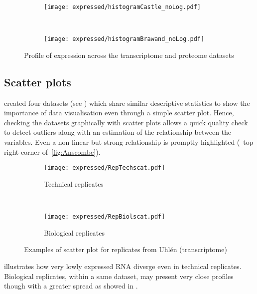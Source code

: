 \begin{sidewaysfigure}
    \centering
    \begin{subfigure}[b]{0.45\textwidth}
        \centering \texttt{[image: expressed/histogramCastle\_noLog.pdf]}
        \caption{}\label{fig:histCastle_nolog}
    \end{subfigure}%
~%
    \begin{subfigure}[b]{0.45\textwidth}
        \centering \texttt{[image: expressed/histogramBrawand\_noLog.pdf]}
        \caption{}\label{fig:histBrawand_nolog}
    \end{subfigure}
    \caption{Profile of expression across the transcriptome
     and proteome datasets}\label{fig:distribPlot}
\end{sidewaysfigure}

\subsection{Scatter plots}

\cite{anscombe} created four datasets (see )
which share similar descriptive statistics to show the importance
of data visualisation even through a simple scatter plot.
Hence, checking the datasets graphically with scatter plots
allows a quick quality check to detect outliers along with an
estimation of the relationship between the variables.
Even a non-linear but strong relationship is promptly highlighted
(\eg\ top right corner of~\cref{fig:Anscombe}).

\begin{figure}
    \centering
    \begin{subfigure}[b]{0.45\textwidth}
        \centering \texttt{[image: expressed/RepTechscat.pdf]}
        \caption{Technical replicates}\label{fig:scatTechRep}
    \end{subfigure}~%
    \begin{subfigure}[b]{0.45\textwidth}
    \centering \texttt{[image: expressed/RepBiolscat.pdf]}
        \caption{Biological replicates}\label{fig:scatBiolRep}
    \end{subfigure}
    \caption{Examples of scatter plot for replicates from Uhlén
    (transcriptome)}\label{fig:scatEg}
\end{figure}

 illustrates how very lowly expressed \gls{RNA}
diverge even in technical replicates.
Biological replicates, within a same dataset,
may present very close profiles though with a greater spread
as showed in .


